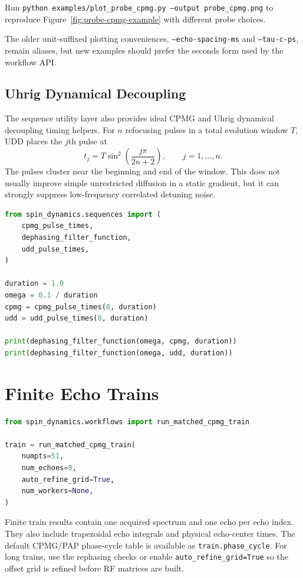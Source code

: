 \documentclass[11pt,oneside]{report}
\newcommand{\code}[1]{\texttt{#1}}
\begin{document}
Run \code{python examples/plot\_probe\_cpmg.py --output probe\_cpmg.png} to
reproduce Figure~\ref{fig:probe-cpmg-example} with different probe choices.

The older unit-suffixed plotting conveniences, \code{--echo-spacing-ms} and
\code{--tau-c-ps}, remain aliases, but new examples should prefer the seconds
form used by the workflow API.

\subsection{Uhrig Dynamical Decoupling}

The sequence utility layer also provides ideal CPMG and Uhrig dynamical
decoupling timing helpers. For \(n\) refocusing pulses in a total evolution
window \(T\), UDD places the \(j\)th pulse at
\[
  t_j = T\sin^2\!\left(\frac{j\pi}{2n+2}\right),\qquad j=1,\ldots,n.
\]
The pulses cluster near the beginning and end of the window. This does not
usually improve simple unrestricted diffusion in a static gradient, but it can
strongly suppress low-frequency correlated detuning noise.

\begin{lstlisting}[language=Python]
from spin_dynamics.sequences import (
    cpmg_pulse_times,
    dephasing_filter_function,
    udd_pulse_times,
)

duration = 1.0
omega = 0.1 / duration
cpmg = cpmg_pulse_times(8, duration)
udd = udd_pulse_times(8, duration)

print(dephasing_filter_function(omega, cpmg, duration))
print(dephasing_filter_function(omega, udd, duration))
\end{lstlisting}

\section{Finite Echo Trains}

\begin{lstlisting}[language=Python]
from spin_dynamics.workflows import run_matched_cpmg_train

train = run_matched_cpmg_train(
    numpts=51,
    num_echoes=8,
    auto_refine_grid=True,
    num_workers=None,
)
\end{lstlisting}

Finite train results contain one acquired spectrum and one echo per echo index.
They also include trapezoidal echo integrals and physical echo-center times.
The default CPMG/PAP phase-cycle table is available as
\code{train.phase\_cycle}.
For long trains, use the rephasing checks or enable
\code{auto\_refine\_grid=True} so the offset grid is refined before RF matrices
are built.
\end{document}
